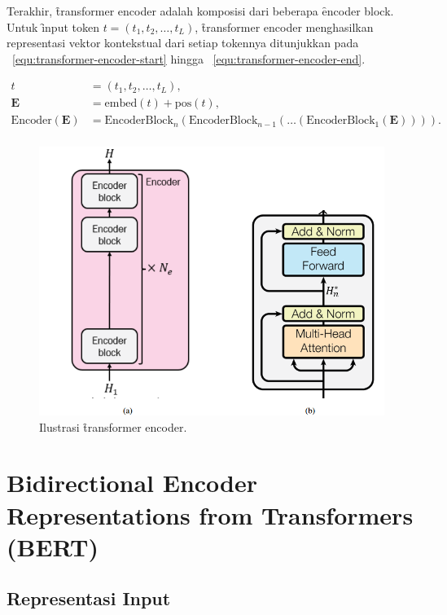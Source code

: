 	Terakhir, \f{transformer encoder} adalah komposisi dari beberapa \f{encoder block}. Untuk \f{input} token $t=(t_1, t_2, \dots, t_L)$, \f{transformer encoder} menghasilkan representasi vektor kontekstual dari setiap tokennya ditunjukkan pada \equ~\ref{equ:transformer-encoder-start} hingga \equ~\ref{equ:transformer-encoder-end}.

	\begin{align}
		\label{equ:transformer-encoder-start} 
		t &= (t_1, t_2, \dots, t_L), \\
		\mathbf{E} &= \text{embed}(t)+ \text{pos}(t), \\
		\label{equ:transformer-encoder-end}
		\text{Encoder}(\mathbf{E}) &= \text{EncoderBlock}_n(\text{EncoderBlock}_{n-1}(\dots(\text{EncoderBlock}_1(\mathbf{E})))). \\
	\end{align}

	\begin{figure}
		\centering
		\includegraphics[width=1\textwidth]{assets/pics/final-transformers-encoder.png}
		\caption{Ilustrasi \f{transformer encoder}.}
		\label{fig:transformer-encoder}
	\end{figure}

\section{Bidirectional Encoder Representations from Transformers (BERT)}
	\subsection{Representasi Input}
	
